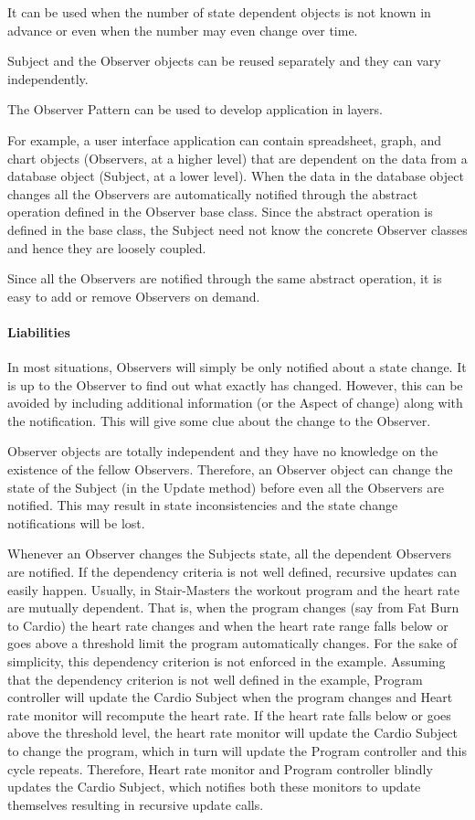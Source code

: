 \documentclass{book}
\begin{document}
    It can be used when the number of state dependent objects is not known in advance or even when the number may even change over time.

    Subject and the Observer objects can be reused separately and they can vary independently.

    The Observer Pattern can be used to develop application in layers.

    For example, a user interface application can contain spreadsheet, graph, and chart objects (Observers, at a higher level) that are dependent on the data from
    a database object (Subject, at a lower level). When the data in the database object changes all the Observers are
    automatically notified through the abstract operation defined in the Observer base class.
    Since the abstract operation is defined in the base class, the Subject need not know the concrete Observer classes and hence they are loosely coupled.

    Since all the Observers are notified through the same abstract operation, it is easy to add or remove Observers on demand.

\paragraph{Liabilities}

    In most situations, Observers will simply be only notified about a state change. It is up to the Observer to find out what exactly has changed.
    However, this can be avoided by including additional information (or the Aspect of change) along with the notification. This will give some clue about the change to the Observer.

    Observer objects are totally independent and they have no knowledge on the existence of the fellow Observers.
    Therefore, an Observer object can change the state of the Subject (in the Update method) before even all the Observers are notified.
    This may result in state inconsistencies and the state change notifications will be lost.

    Whenever an Observer changes the Subjects state, all the dependent Observers are notified. If the dependency criteria is not well defined, recursive updates can easily happen.
    Usually, in Stair-Masters the workout program and the heart rate are mutually dependent.
    That is, when the program changes (say from Fat Burn to Cardio) the heart rate changes and when the heart rate range falls below or goes above a threshold limit the program automatically changes.
    For the sake of simplicity, this dependency criterion is not enforced in the example.
    Assuming that the dependency criterion is not well defined in the example,
    Program controller will update the Cardio Subject when the program changes and Heart rate monitor will recompute the heart rate.
    If the heart rate falls below or goes above the threshold level, the heart rate monitor will update the Cardio Subject to change the program,
    which in turn will update the Program controller and this cycle repeats. Therefore, Heart rate monitor and Program controller blindly updates the Cardio Subject,
    which notifies both these monitors to update themselves resulting in recursive update calls.
\end{document}
